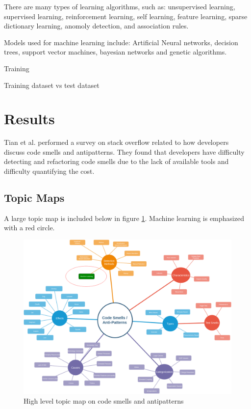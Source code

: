 \documentclass[conference]{IEEEtran}
\begin{document}
There are many types of learning algorithms, such as: unsupervised learning, supervised learning, reinforcement learning, self learning, feature learning, sparse dictionary learning, anomoly detection, and association rules.

Models used for machine learning include: Artificial Neural networks, decision trees, support vector machines, bayesian networks and genetic algorithms.

Training

Training dataset vs test dataset

\section{Results}
Tian et al.\cite{tian_how_2019} performed a survey on stack overflow related to how developers discuss code smells and antipatterns. They found that developers have difficulty detecting and refactoring code smells due to the lack of available tools and difficulty quantifying the cost.
\subsection{Topic Maps}

A large topic map is included below in figure \ref{fig:TM}.
Machine learning is emphasized with a red circle. 
\begin{figure}[ht]
  \centerline{\includegraphics[width=\linewidth]{AntiPattern-TopicMap.png}}
  \caption{High level topic map on code smells and antipatterns}
  \label{fig:TM}
\end{figure} 
\end{document}
